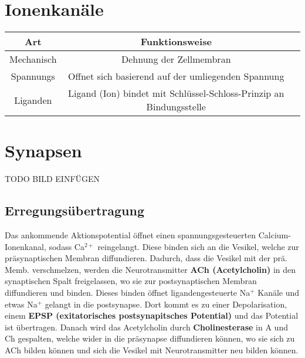 \documentclass{article}
\begin{document}
\section{Ionenkanäle}
\begin{center}
\begin{tabular}{ |c|c|c| }
\hline
 Art & Funktionsweise \\ 
\hline
 Mechanisch & Dehnung der Zellmembran \\
\hline
 Spannungs & Offnet sich basierend auf der umliegenden Spannung \\
\hline
 Liganden & Ligand (Ion) bindet mit Schlüssel-Schloss-Prinzip an Bindungsstelle \\
\hline 
\end{tabular}
\end{center} 
\section{Synapsen}
TODO BILD EINFÜGEN
\subsection{Erregungsübertragung}
Das ankommende Aktionspotential öffnet einen spannungsgesteuerten Calcium-Ionenkanal, sodass Ca$^{2+}$ reingelangt. Diese binden sich an die Vesikel, welche zur präsynaptischen Membran diffundieren. \newline
Dadurch, dass die Vesikel mit der prä. Memb. verschmelzen, werden die Neurotransmitter \textbf{ACh (Acetylcholin)} in den synaptischen Spalt freigelassen, wo sie zur postsynaptischen Membran diffundieren und binden. \newline
Dieses binden öffnet ligandengesteuerte Na$^+$ Kanäle und etwas Na$^+$ gelangt in die postsynapse. Dort kommt es zu einer Depolarisation, einem \textbf{EPSP (exitatorisches postsynapitsches Potential)} und das Potential ist übertragen. \newline
Danach wird das Acetylcholin durch \textbf{Cholinesterase} in A und Ch gespalten, welche wider in die präsynapse diffundieren können, wo sie sich zu ACh bilden können und sich die Vesikel mit Neurotransmitter neu bilden können.
\end{document}
